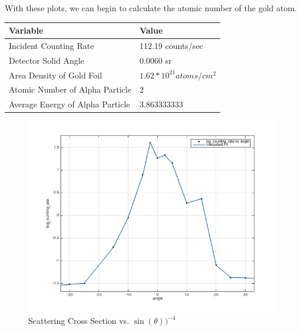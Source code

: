 With these plots, we can begin to calculate the atomic number of the gold atom. 

\begin{table}[h]
  \begin{tabular}{|l|l|}
  \hline 
  Variable                         & Value               \\ \hline \hline 
  Incident Counting Rate           & 112.19 counts/sec   \\
  Detector Solid Angle             & 0.0060 sr           \\
  Area Density of Gold Foil        & $1.62 * 10^{21} atoms/cm^2$ \\
  Atomic Number of Alpha Particle  & 2                   \\
  Average Energy of Alpha Particle & 3.863333333        \\ \hline
  \end{tabular}
  \label{Values}
\end{table}

\begin{figure}[h]
  \includegraphics[width=5 cm]{InterpolantFit.png}
  \begin{center}
  \caption{Scattering Cross Section vs. $\sin(\theta))^{-4}$}
  \label{InterpolantFit}
  \end{center}
\end{figure}




